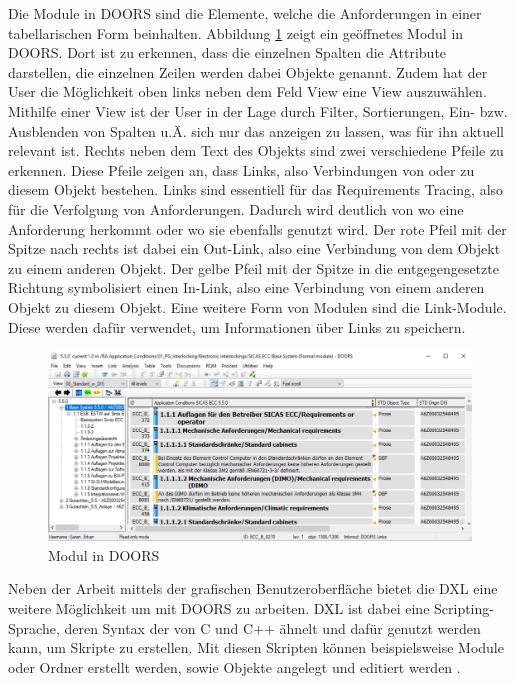 Die Module in \acs{DOORS} sind die Elemente, welche die Anforderungen in einer tabellarischen Form beinhalten. Abbildung \ref*{fig:Doors Modul} zeigt ein geöffnetes Modul in \acs{DOORS}. Dort ist zu erkennen,
dass die einzelnen Spalten die Attribute darstellen, die einzelnen Zeilen werden dabei Objekte genannt. Zudem hat der User die Möglichkeit oben links neben dem Feld \glqq View\grqq{} eine View auszuwählen. Mithilfe einer View 
ist der User in der Lage durch Filter, Sortierungen, Ein- bzw. Ausblenden von Spalten u.Ä. sich nur das anzeigen zu lassen, was für ihn aktuell relevant ist. Rechts neben dem Text des Objekts sind 
zwei verschiedene Pfeile zu erkennen. Diese Pfeile zeigen an, dass Links, also Verbindungen von oder zu diesem Objekt bestehen. Links sind essentiell für das Requirements Tracing, also für die
Verfolgung von Anforderungen. Dadurch wird deutlich von wo eine Anforderung herkommt oder wo sie ebenfalls genutzt wird. Der rote Pfeil mit der Spitze nach rechts ist dabei ein Out-Link, also eine
Verbindung von dem Objekt zu einem anderen Objekt. Der gelbe Pfeil mit der Spitze in die entgegengesetzte Richtung symbolisiert einen In-Link, also eine Verbindung von einem anderen Objekt zu diesem 
Objekt. Eine weitere Form von Modulen sind die Link-Module. Diese werden dafür verwendet, um Informationen über Links zu speichern. 

\begin{figure}[H]
    \centering
    \includegraphics[width = \textwidth]{abbildungen/Modul in Doors.PNG}
    \caption{Modul in \acs{DOORS}}
    \label{fig:Doors Modul}
\end{figure}

Neben der Arbeit mittels der grafischen Benutzeroberfläche bietet die \ac*{DXL} eine weitere Möglichkeit um mit \acs{DOORS} zu arbeiten. \acs{DXL} ist dabei eine Scripting-Sprache, deren
Syntax der von C und C++ ähnelt und dafür genutzt werden kann, um Skripte zu erstellen. Mit diesen Skripten können beispielsweise Module oder Ordner erstellt werden, sowie Objekte angelegt und 
editiert werden \cite[]{q7}. 